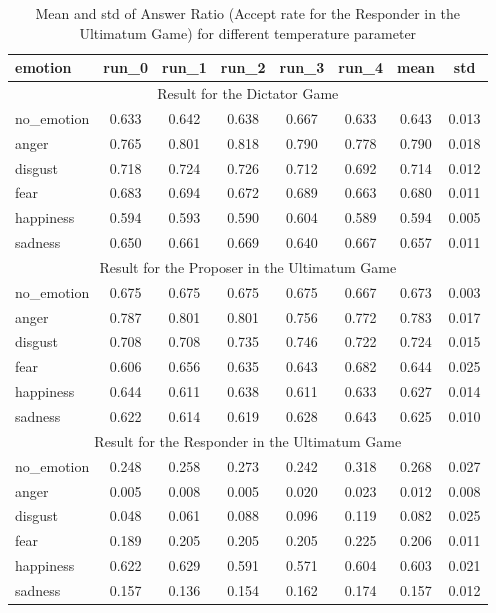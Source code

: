 \documentclass{article}
\begin{document}
\begin{table}[h!]
\centering
\caption{Mean and std of Answer Ratio (Accept rate for the Responder in the Ultimatum Game) for different temperature parameter}
\label{tab: a_mean_std_temp}
\begin{tabular}{lccccccc}
\hline
\textbf{emotion} & \textbf{run\_0} & \textbf{run\_1} & \textbf{run\_2} & \textbf{run\_3} & \textbf{run\_4} & \textbf{mean} & \textbf{std} \\
\hline
\multicolumn{8}{c}{Result for the Dictator Game} \\
\hline
no\_emotion & 0.633 & 0.642 & 0.638 & 0.667 & 0.633 & 0.643 & 0.013 \\
anger       & 0.765 & 0.801 & 0.818 & 0.790 & 0.778 & 0.790 & 0.018 \\
disgust     & 0.718 & 0.724 & 0.726 & 0.712 & 0.692 & 0.714 & 0.012 \\
fear        & 0.683 & 0.694 & 0.672 & 0.689 & 0.663 & 0.680 & 0.011 \\
happiness   & 0.594 & 0.593 & 0.590 & 0.604 & 0.589 & 0.594 & 0.005 \\
sadness     & 0.650 & 0.661 & 0.669 & 0.640 & 0.667 & 0.657 & 0.011 \\
\hline
\multicolumn{8}{c}{Result for the Proposer in the Ultimatum Game} \\
no\_emotion & 0.675 & 0.675 & 0.675 & 0.675 & 0.667 & 0.673 & 0.003 \\
anger       & 0.787 & 0.801 & 0.801 & 0.756 & 0.772 & 0.783 & 0.017 \\
disgust     & 0.708 & 0.708 & 0.735 & 0.746 & 0.722 & 0.724 & 0.015 \\
fear        & 0.606 & 0.656 & 0.635 & 0.643 & 0.682 & 0.644 & 0.025 \\
happiness   & 0.644 & 0.611 & 0.638 & 0.611 & 0.633 & 0.627 & 0.014 \\
sadness     & 0.622 & 0.614 & 0.619 & 0.628 & 0.643 & 0.625 & 0.010 \\
\hline
\multicolumn{8}{c}{Result for the Responder in the Ultimatum Game} \\
no\_emotion & 0.248 & 0.258 & 0.273 & 0.242 & 0.318 & 0.268 & 0.027 \\
anger       & 0.005 & 0.008 & 0.005 & 0.020 & 0.023 & 0.012 & 0.008 \\
disgust     & 0.048 & 0.061 & 0.088 & 0.096 & 0.119 & 0.082 & 0.025 \\
fear        & 0.189 & 0.205 & 0.205 & 0.205 & 0.225 & 0.206 & 0.011 \\
happiness   & 0.622 & 0.629 & 0.591 & 0.571 & 0.604 & 0.603 & 0.021 \\
sadness     & 0.157 & 0.136 & 0.154 & 0.162 & 0.174 & 0.157 & 0.012 \\
\hline
\end{tabular}
\end{table}
\end{document}
